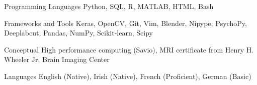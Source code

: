

\begin{cvskills}

 \cvskill
  	{Programming Languages}
    {Python, SQL, R, MATLAB, HTML, Bash} %
  
 \cvskill
   {Frameworks and Tools}
   {Keras, OpenCV, Git, Vim, Blender, Nipype, PsychoPy, Deeplabcut, Pandas, NumPy, Scikit-learn, Scipy}
   
 \cvskill
   {Conceptual}
   {High performance computing (Savio), MRI certificate from Henry H. Wheeler Jr. Brain Imaging Center}
   
  \cvskill
   {Languages}
   {English (Native), Irish (Native), French (Proficient), German (Basic)}
    

\end{cvskills}
